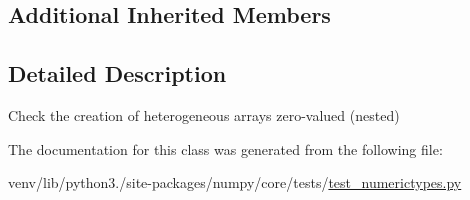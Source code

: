 \subsection*{Additional Inherited Members}


\subsection{Detailed Description}
\begin{DoxyVerb}Check the creation of heterogeneous arrays zero-valued (nested)\end{DoxyVerb}
 

The documentation for this class was generated from the following file\+:\begin{DoxyCompactItemize}
\item 
venv/lib/python3./site-\/packages/numpy/core/tests/\hyperlink{test__numerictypes_8py}{test\+\_\+numerictypes.\+py}\end{DoxyCompactItemize}
